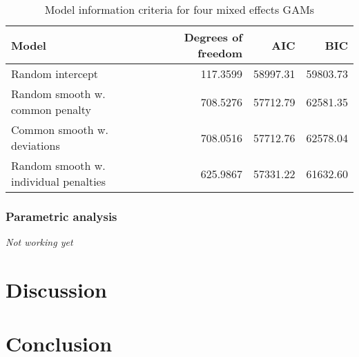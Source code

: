 \documentclass[man, floatsintext]{apa7}
\begin{document}
\begin{table}[htbp]
  \vspace*{2em}
  \begin{threeparttable}
    \caption{Model information criteria for four mixed effects GAMs}
    \label{tab:ic_tab}
    \begin{tabular}{@{}lrrr@{}} \toprule
      Model                                 & Degrees of freedom & AIC      &
      BIC
      \\ \midrule
      Random intercept                      & 117.3599           & 58997.31 &
      59803.73
      \\
      Random smooth w. common penalty       & 708.5276           & 57712.79 &
      62581.35
      \\
      Common smooth w. deviations           & 708.0516           & 57712.76 &
      62578.04
      \\
      Random smooth w. individual penalties & 625.9867           & 57331.22 &
      61632.60
      \\ \midrule
    \end{tabular}
  \end{threeparttable}
\end{table}

\subsubsection{Parametric analysis}

\textit{Not working yet}

\section{Discussion}

\section{Conclusion}

\printbibliography[]
\end{document}
